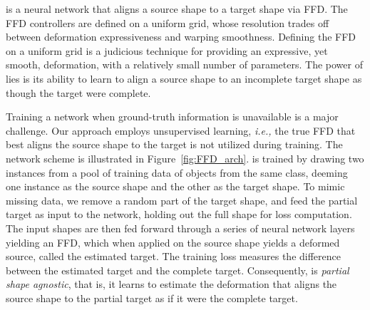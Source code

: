 \documentclass[acmtog,timestamp]{acmart}%
\begin{document}
\begin{comment}
3. The regularizations and any additions on the Vanilla scheme
\end{comment}\ourmethod{} is a neural network that aligns a source shape to a target shape via FFD. The FFD controllers are defined on a uniform grid, whose resolution trades off between deformation expressiveness and warping smoothness. Defining the FFD on a uniform grid is a judicious technique for providing an expressive, yet smooth, deformation, with a relatively small number of parameters. The power of \ourmethod{} lies is its ability to learn to align a source shape to an incomplete target shape as though the target were complete.

Training a network when ground-truth information is unavailable is a major challenge.
Our approach employs unsupervised learning, \emph{i.e.,} the true FFD that best aligns the source shape to the target is not utilized during training. The network scheme is illustrated in Figure~\ref{fig:FFD_arch}. \ourmethod{} is trained by drawing two instances from a pool of training data of objects from the same class, deeming one instance as the source shape and the other as the target shape. To mimic missing data, we remove a random part of the target shape, and feed the partial target as input to the network, holding out the full shape for loss computation. The input shapes are then fed forward through a series of neural network layers yielding an FFD, which when applied on the source shape yields a deformed source, called the estimated target. The training loss measures the difference between the estimated target and the complete target. Consequently, \ourmethod{} is \emph{partial shape agnostic}, that is, it learns to estimate the deformation that aligns the source shape to the partial target as if it were the complete target.
\end{document}
